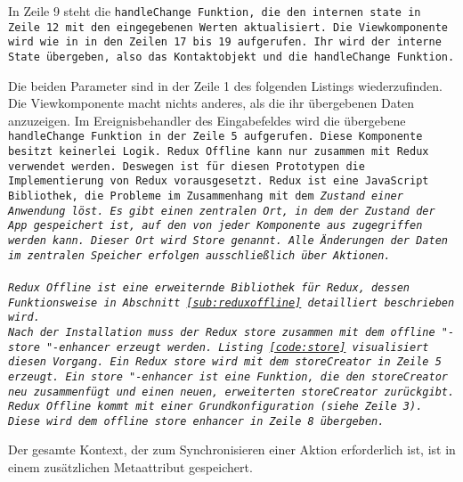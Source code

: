 In Zeile 9 steht die \tt{handleChange} Funktion, die den internen \tt{state} in Zeile 12 mit den eingegebenen Werten aktualisiert.
Die Viewkomponente wird wie in in den Zeilen 17 bis 19 aufgerufen. Ihr wird der interne State übergeben, also das Kontaktobjekt und die \tt{handleChange} Funktion. 
\begin{center}
  
\end{center}
%
Die beiden Parameter sind in der Zeile 1 des folgenden Listings wiederzufinden.
Die Viewkomponente macht nichts anderes, als die ihr übergebenen Daten anzuzeigen.
Im Ereignisbehandler des Eingabefeldes wird die übergebene \tt{handleChange} Funktion in der Zeile 5 aufgerufen.
Diese Komponente besitzt keinerlei Logik.
%
%
Redux Offline kann nur zusammen mit Redux verwendet werden. Deswegen ist für diesen Prototypen die Implementierung von Redux vorausgesetzt.
Redux ist eine JavaScript Bibliothek, die Probleme im Zusammenhang mit dem \it{Zustand} einer Anwendung löst.
Es gibt einen zentralen Ort, in dem der \it{Zustand} der App gespeichert ist, auf den von jeder Komponente aus zugegriffen werden kann.
Dieser Ort wird Store genannt. Alle Änderungen der Daten im zentralen Speicher erfolgen ausschließlich über Aktionen.\\\\
%
Redux Offline ist eine erweiternde Bibliothek für Redux, dessen Funktionsweise in Abschnitt \ref{sub:reduxoffline} detailliert beschrieben wird.\\
Nach der Installation muss der Redux \tt{store} zusammen mit dem \tt{offline "-store "-enhancer} erzeugt werden. Listing \ref{code:store} visualisiert diesen Vorgang. Ein Redux \tt{store} wird mit dem \tt{storeCreator} in Zeile 5 erzeugt. Ein \tt{store "-enhancer} ist eine Funktion, die den \tt{storeCreator} neu zusammenfügt und einen neuen, erweiterten \tt{storeCreator} zurückgibt.
Redux Offline kommt mit einer Grundkonfiguration (siehe Zeile 3). Diese wird dem \tt{offline store enhancer} in Zeile 8 übergeben.
\begin{center}
  
\end{center}
Der gesamte Kontext, der zum Synchronisieren einer Aktion erforderlich ist, ist in einem zusätzlichen Metaattribut gespeichert.
